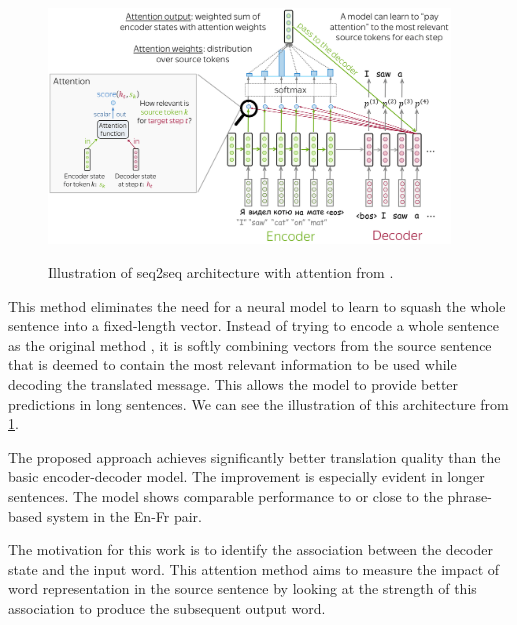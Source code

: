\begin{figure}[h]
    {\includegraphics[width=0.95\textwidth]{img/attseq2seq.png}}
    \centering
    \caption{Illustration of seq2seq architecture with attention from .}
    \label{img:attseq2seq}
\end{figure}

This method eliminates the need for a neural model to learn to squash the whole sentence into a fixed-length vector. Instead of trying to encode a whole sentence as the original method , it is softly combining vectors from the source sentence that is deemed to contain the most relevant information to be used while decoding the translated message. This allows the model to provide better predictions in long sentences. We can see the illustration of this architecture from \cref{img:attseq2seq}.


The proposed approach achieves significantly better translation quality than the basic encoder-decoder model. The improvement is especially evident in longer sentences. The model shows comparable performance to or close to the phrase-based system in the En-Fr pair.

The motivation for this work is to identify the association between the decoder state and the input word. This attention method aims to measure the impact of word representation in the source sentence by looking at the strength of this association to produce the subsequent output word.

